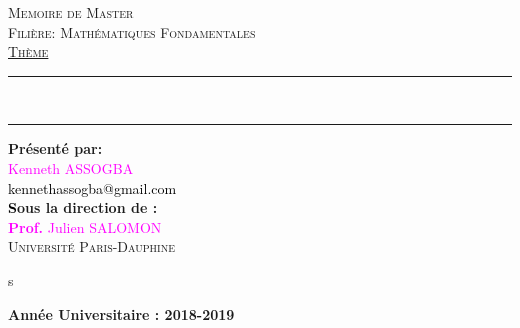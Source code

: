 \begin{titlepage}
\begin{center}

\begin{center}
\textsc{Memoire de Master}\\
\vspace{0.5cm}
\textsc{Filière: Mathématiques Fondamentales}\\
\vspace{1.2cm}
\textsc{\underline{Thème}}\\
\vspace{0.8cm}
\end{center}

\rule{\linewidth}{1mm}\\
\begin{center}
\textsc{\textbf{ \color{blue}{Schémas monotones discrétisés en temps pour l'équation de Schrödinger}}}
\end{center}
\rule{\linewidth}{1mm}
\vspace{1cm}
\begin{flushright}
\textbf{Présenté par:}\\
\vspace{0.2cm}
\textcolor{magenta}{Kenneth ASSOGBA}\\
\textcolor{black}{kennethassogba@gmail.com}\\
\vspace{1cm}
\textbf{\textcolor{black}Sous la direction de :}\\
\vspace{0.2cm}
\textcolor{magenta}{\textbf{Prof.} Julien SALOMON}\\
\textsc{Université Paris-Dauphine}\\
\vspace{0.2cm}
\end{flushright}
\vspace{2cm}
s
\vspace{4cm}
\begin{center}
\noindent \textbf{Année Universitaire : 2018-2019}
\end{center}
\end{center}
\end{titlepage}